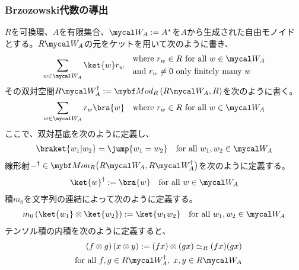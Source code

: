 {\subsubsection{Brzozowski代数の導出}\label{s3:Brzozowski代数の導出} %
	$R$を可換環、$A$を有限集合、$\W_A:=A^*$を$A$から生成された自由モノイド
	とする。$R\W_A$の元をケットを用いて次のように書き、
	\begin{equation*}\begin{split}
		\sum_{w\in\W_A} \ket{w}r_w \quad\begin{split}
			&\text{where } r_w\in R \text{ for all } w\in\W_A \\
			&\text{and } r_w\neq 0 \text{ only finitely many } w
		\end{split}
	\end{split}\end{equation*}
	その双対空間$R\W_A^\dag:=\cat{Mod}_R\lr{R\W_A,R}$を次のように書く。
	\begin{equation*}\begin{split}
		\sum_{w\in\W_A} r_w\bra{w}
			\quad\text{where } r_w\in R \text{ for all } w\in\W_A \\
	\end{split}\end{equation*}
	ここで、双対基底を次のように定義し、
	\begin{equation*}\begin{split}
		\braket{w_1|w_2} = \jump{w_1 = w_2} \quad\text{for all } w_1,w_2\in\W_A
	\end{split}\end{equation*}
	線形射$-^\dag\in\cat{Mon}_R\glr{R\W_A,R\W_A^\dag}$を次のように定義する。
	\begin{equation*}\begin{split}
		\ket{w}^\dag := \bra{w} \quad\text{for all } w\in\W_A
	\end{split}\end{equation*}
	積$m_0$を文字列の連結によって次のように定義する。
	\begin{equation*}\begin{split}
		m_0\lr{\ket{w_1}\otimes\ket{w_2}} := \ket{w_1w_2}
		\quad\text{for all } w_1,w_2\in\W_A
	\end{split}\end{equation*}
	テンソル積の内積を次のように定義すると、
	\begin{equation*}\begin{split}
		\lr{f\otimes g}\lr{x\otimes y} := (fx)\otimes(gx) \simeq_R (fx)(gx) \\
		\quad\text{for all } f,g\in R\W_A^\dag,\; x,y\in R\W_A

\end{split}
\end{equation*}}
